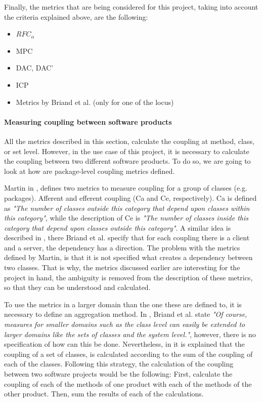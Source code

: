 Finally, the metrics that are being considered for this project, taking into account the criteria explained above, are the following:

\begin{itemize} %
    \item $RFC_\alpha$
    \item MPC
    \item DAC, DAC'
    \item ICP
    \item Metrics by Briand et al. (only for one of the locus)
\end{itemize}

\paragraph{Measuring coupling between software products}
All the metrics described in this section, calculate the coupling at method, class, or set level. However, in the use case of this project, it is necessary to calculate the coupling between two different software products. To do so, we are going to look at how are package-level coupling metrics defined.

Martin in \cite{martin1994oo}, defines two metrics to measure coupling for a group of classes (e.g. packages). Afferent and efferent coupling (Ca and Ce, respectively). Ca is defined as \textit{"The number of classes outside this category that depend upon classes within this category"}, while the description of Ce is \textit{"The number of classes inside this category that depend upon classes outside this category"}. A similar idea is described in \cite{briand1999unified}, there Briand et al. specify that for each coupling there is a client and a server, the dependency has a direction. The problem with the metrics defined by Martin, is that it is not specified what creates a dependency between two classes. That is why, the metrics discussed earlier are interesting for the project in hand, the ambiguity is removed from the description of these metrics, so that they can be understood and calculated.

To use the metrics in a larger domain than the one these are defined to, it is necessary to define an aggregation method. In \cite{briand1999unified}, Briand et al. state \textit{"Of course, measures for smaller domains such as the class level can easily be extended to larger domains like the sets of classes and the system level."}, however, there is no specification of how can this be done.
Nevertheless, in  it is explained that the coupling of a set of classes, is calculated according to the sum of the coupling of each of the classes. Following this strategy, the calculation of the coupling between two software projects would be the following: First, calculate the coupling of each of the methods of one product with each of the methods of the other product. Then, sum the results of each of the calculations.

